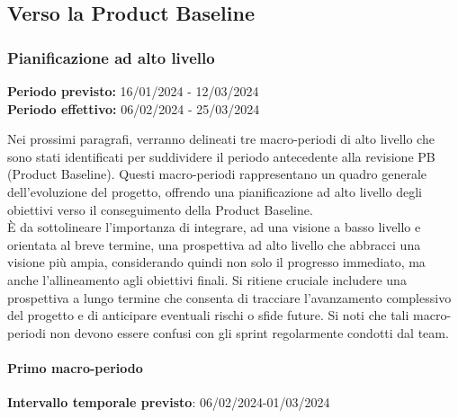 \subsection{Verso la Product Baseline}

\subsubsection{Pianificazione ad alto livello}

\textbf{Periodo previsto:} 16/01/2024 - 12/03/2024 \\ 
\vspace{0.2cm} 
\textbf{Periodo effettivo:} 06/02/2024 - 25/03/2024 \\ 
\vspace{0.2cm} 

Nei prossimi paragrafi, verranno delineati tre macro-periodi di alto livello che sono stati identificati per suddividere il periodo antecedente alla revisione PB (Product Baseline). Questi macro-periodi rappresentano un quadro generale dell'evoluzione del progetto, offrendo una pianificazione ad alto livello degli obiettivi verso il conseguimento della Product Baseline. \\
È da sottolineare l'importanza di integrare, ad una visione a basso livello e orientata al breve termine, una prospettiva ad alto livello che abbracci una visione più ampia, considerando quindi non solo il progresso immediato, ma anche l'allineamento agli obiettivi finali. Si ritiene cruciale includere una prospettiva a lungo termine che consenta di tracciare l'avanzamento complessivo del progetto e di anticipare eventuali rischi o sfide future.
Si noti che tali macro-periodi non devono essere confusi con gli sprint regolarmente condotti dal team.

\paragraph{Primo macro-periodo}

\textbf{Intervallo temporale previsto}: 06/02/2024-01/03/2024 \\ 

\vspace{0.2cm}

